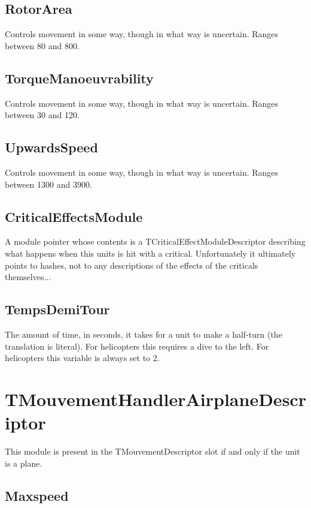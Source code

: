 \documentclass{article}
\begin{document}
\subsection{RotorArea}

Controls movement in some way, though in what way is uncertain. Ranges between 80 and 800.

\subsection{TorqueManoeuvrability}

Controls movement in some way, though in what way is uncertain. Ranges between 30 and 120.

\subsection{UpwardsSpeed}

Controls movement in some way, though in what way is uncertain. Ranges between 1300 and 3900.

\subsection{CriticalEffectsModule}

A module pointer whose contents is a TCriticalEffectModuleDescriptor describing what happens when this units is hit with a critical. Unfortunately it ultimately points to hashes, not to any descriptions of the effects of the criticals themselves...

\subsection{TempsDemiTour}

The amount of time, in seconds, it takes for a unit to make a half-turn (the translation is literal). For helicopters this requires a dive to the left. For helicopters this variable is always set to 2.

\section{TMouvementHandlerAirplaneDescriptor}

This module is present in the TMouvementDescriptor slot if and only if the unit is a plane.

\subsection{Maxspeed}
\end{document}
